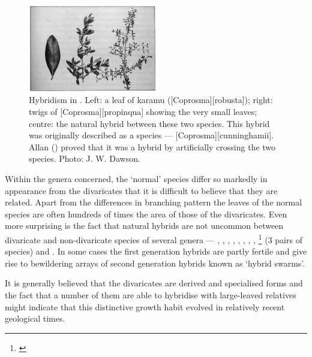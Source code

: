 \begin{figure}
	\includegraphics[width=0.5\textwidth]{graphics/figure80coprosma.jpg}
	\centering
	\caption[Hybridism in Coprosma]{Hybridism in .
	Left: a leaf of karamu ([Coprosma][robusta]); right: twigs of [Coprosma][propinqua] showing the very small leaves; centre: the natural hybrid between these two species.
	This hybrid was originally described as a species --- [Coprosma][cunninghamii].
	Allan (\cite{allan1924hybridity}) proved that it was a hybrid by artificially crossing the two species.
	Photo:  J. W. Dawson.}%
	\label{fig:80coprosma}
\end{figure}

Within the genera concerned, the `normal' species differ so markedly in appearance from the divaricates that it is difficult to believe that they are related.
Apart from the differences in branching pattern the leaves of the normal species are often hundreds of times the area of those of the divaricates.
Even more surprising is the fact that natural hybrids are not uncommon between divaricate and non-divaricate species of several genera --- , , , , , , , , \footnote{\cite{allan1924hybridity}} (3 pairs of species) and .
In some cases the first generation hybrids are partly fertile and give rise to bewildering arrays of second generation hybrids known as `hybrid swarms'.

It is generally believed that the divaricates are derived and specialised forms and the fact that a number of them are able to hybridise with large-leaved relatives might indicate that this distinctive growth habit evolved in relatively recent geological times.

